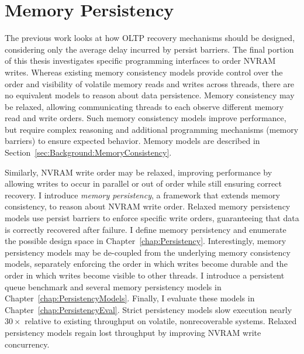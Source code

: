 \section{Memory Persistency}
\label{sec:Intro:PMC}

The previous work looks at how OLTP recovery mechanisms should be designed, considering only the average delay incurred by persist barriers.
The final portion of this thesis investigates specific programming interfaces to order NVRAM writes.
Whereas existing memory consistency models provide control over the order and visibility of volatile memory reads and writes across threads, there are no equivalent models to reason about data persistence.
Memory consistency may be relaxed, allowing communicating threads to each observe different memory read and write orders.
Such memory consistency models improve performance, but require complex reasoning and additional programming mechanisms (memory barriers) to ensure expected behavior.
Memory models are described in Section~\ref{sec:Background:MemoryConsistency}.

Similarly, NVRAM write order may be relaxed, improving performance by allowing writes to occur in parallel or out of order while still ensuring correct recovery.
I introduce \emph{memory persistency}, a framework that extends memory consistency, to reason about NVRAM write order.
Relaxed memory persistency models use persist barriers to enforce specific write orders, guaranteeing that data is correctly recovered after failure.
I define memory persistency and enumerate the possible design space in Chapter~\ref{chap:Persistency}.
Interestingly, memory persistency models may be de-coupled from the underlying memory consistency models, separately enforcing the order in which writes become durable and the order in which writes become visible to other threads.
I introduce a persistent queue benchmark and several memory persistency models in Chapter~\ref{chap:PersistencyModels}.
Finally, I evaluate these models in Chapter~\ref{chap:PersistencyEval}.
Strict persistency models slow execution nearly $30\times$ relative to existing throughput on volatile, nonrecoverable systems.
Relaxed persistency models regain lost throughput by improving NVRAM write concurrency.

